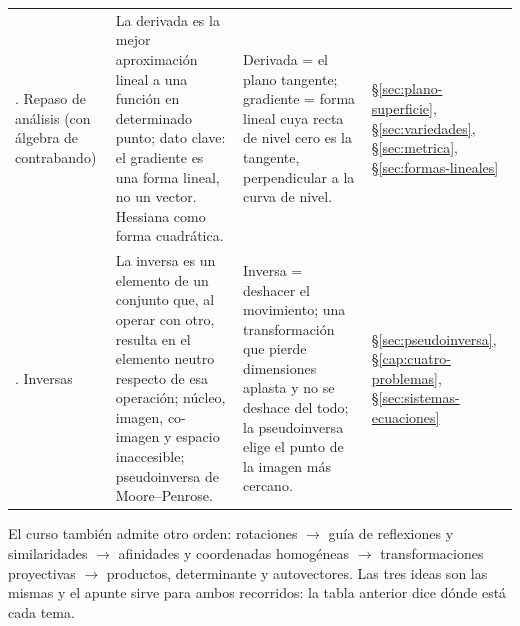 {\begin{longtable}{>{\raggedright\arraybackslash}p{20mm}>{\raggedright\arraybackslash}p{60mm}>{\raggedright\arraybackslash}p{44mm}>{\raggedright\arraybackslash}p{28mm}}
9. Repaso de análisis (con álgebra de contrabando) &
La derivada es la mejor aproximación lineal a una función en determinado punto;
dato clave: el gradiente es una forma lineal, no un vector. Hessiana como forma
cuadrática. &
Derivada = el plano tangente; gradiente = forma lineal cuya recta de nivel cero es la
tangente, perpendicular a la curva de nivel. &
\S\ref{sec:plano-superficie}, \S\ref{sec:variedades}, \S\ref{sec:metrica},
\S\ref{sec:formas-lineales}\\
10. Inversas &
La inversa es un elemento de un conjunto que, al operar con otro, resulta en el elemento
neutro respecto de esa operación; núcleo, imagen, co-imagen y espacio inaccesible;
pseudoinversa de Moore--Penrose. &
Inversa = deshacer el movimiento; una transformación que pierde dimensiones aplasta y no se
deshace del todo; la pseudoinversa elige el punto de la imagen más cercano. &
\S\ref{sec:pseudoinversa}, \S\ref{cap:cuatro-problemas}, \S\ref{sec:sistemas-ecuaciones}\\
\end{longtable}
}

\begin{atencion}
El curso también admite otro orden: rotaciones \(\to\) guía de
reflexiones y similaridades \(\to\) afinidades y coordenadas homogéneas \(\to\)
transformaciones proyectivas \(\to\) productos, determinante y autovectores. Las tres ideas
son las mismas y el apunte sirve para ambos recorridos: la tabla anterior dice dónde está
cada tema.
\end{atencion}


